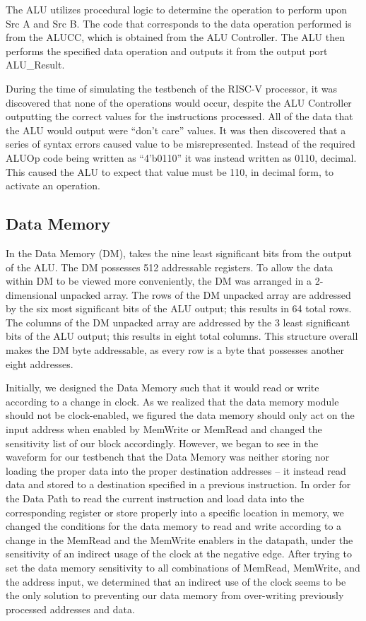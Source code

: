 \documentclass{article}
\begin{document}
The ALU utilizes procedural logic to determine the operation to perform upon Src A and Src B. The code that corresponds to the data operation performed is from the ALUCC, which is obtained from the ALU Controller. The ALU then performs the specified data operation and outputs it from the output port ALU\_Result.

During the time of simulating the testbench of the RISC-V processor, it was discovered that none of the operations would occur, despite the ALU Controller outputting the correct values for the instructions processed. All of the data that the ALU would output were ``don't care'' values. It was then discovered that a series of syntax errors caused value to be misrepresented. Instead of the required ALUOp code being written as ``4'b0110'' it was instead written as 0110, decimal. This caused the ALU to expect that value must be 110, in decimal form, to activate an operation.

\subsection{Data Memory}
In the Data Memory (DM), takes the nine least significant bits from the output of the ALU. The DM possesses 512 addressable registers. To allow the data within DM to be viewed more conveniently, the DM was arranged in a 2-dimensional unpacked array. The rows of the DM unpacked array are addressed by the six most significant bits of the ALU output; this results in 64 total rows. The columns of the DM unpacked array are addressed by the 3 least significant bits of the ALU output; this results in eight total columns. This structure overall makes the DM byte addressable, as every row is a byte that possesses another eight addresses. 

Initially, we designed the Data Memory such that it would read or write according to a change in clock. As we realized that the data memory module should not be clock-enabled, we figured the data memory should only act on the input address when enabled by MemWrite or MemRead and changed the sensitivity list of our block accordingly. However, we began to see in the waveform for our testbench that the Data Memory was neither storing nor loading the proper data into the proper destination addresses -- it instead read data and stored to a destination specified in a previous instruction. In order for the Data Path to read the current instruction and load data into the corresponding register or store properly into a specific location in memory, we changed the conditions for the data memory to read and write according to a change in the MemRead and the MemWrite enablers in the datapath, under the sensitivity of an indirect usage of the clock at the negative edge. After trying to set the data memory sensitivity to all combinations of MemRead, MemWrite, and the address input, we determined that an indirect use of the clock seems to be the only solution to preventing our data memory from over-writing previously processed addresses and data.
\end{document}
